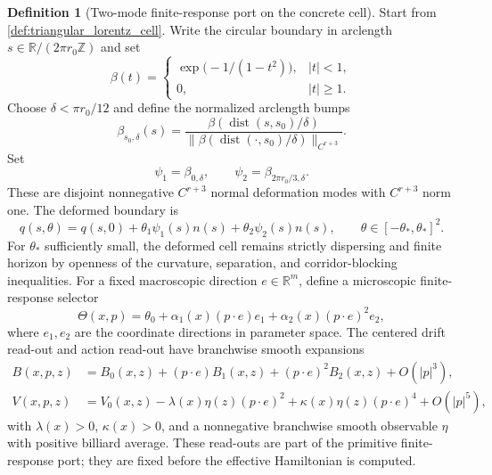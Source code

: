 \documentclass[11pt]{amsart}
\theoremstyle{definition}
\newtheorem{definition}[theorem]{Definition}
\theoremstyle{remark}
\newcommand{\R}{\mathbb R}
\newcommand{\dist}{\operatorname{dist}}
\begin{document}
\begin{definition}[Two-mode finite-response port on the concrete cell]
\label{def:two_mode_port_example}
Start from \cref{def:triangular_lorentz_cell}.  Write the circular boundary in
arclength $s\in\R/(2\pi r_0\mathbb Z)$ and set
\[
  \beta(t)=
  \begin{cases}
  \exp\!\bigl(-1/(1-t^2)\bigr),& |t|<1,\\
  0,& |t|\ge1.
  \end{cases}
\]
Choose $\delta<\pi r_0/12$ and define the normalized arclength bumps
\[
  \beta_{s_0,\delta}(s)
  =
  \frac{\beta(\dist(s,s_0)/\delta)}
  {\|\beta(\dist(\cdot,s_0)/\delta)\|_{C^{r+3}}}.
\]
Set
\[
  \psi_1=\beta_{0,\delta},
  \qquad
  \psi_2=\beta_{2\pi r_0/3,\delta}.
\]
These are disjoint nonnegative $C^{r+3}$ normal deformation modes with
$C^{r+3}$ norm one.  The deformed boundary is
\[
  q(s,\theta)=q(s,0)+\theta_1\psi_1(s)n(s)
  +\theta_2\psi_2(s)n(s),
  \qquad \theta\in[-\theta_*,\theta_*]^2 .
\]
For $\theta_*$ sufficiently small, the deformed cell remains strictly
dispersing and finite horizon by openness of the curvature, separation, and
corridor-blocking inequalities.
For a fixed macroscopic direction $e\in\R^m$, define a microscopic
finite-response selector
\begin{equation}
  \Theta(x,p)=
  \theta_0+\alpha_1(x)(p\cdot e)e_1
  +\alpha_2(x)(p\cdot e)^2 e_2 ,
\end{equation}
where $e_1,e_2$ are the coordinate directions in parameter space.  The centered
drift read-out and action read-out have branchwise smooth expansions
\begin{align}
  B(x,p,z)&=B_0(x,z)+(p\cdot e)B_1(x,z)+(p\cdot e)^2B_2(x,z)+O(|p|^3),\\
  V(x,p,z)&=V_0(x,z)-\lambda(x)\eta(z)(p\cdot e)^2
  +\kappa(x)\eta(z)(p\cdot e)^4+O(|p|^5),
\end{align}
with $\lambda(x)>0$, $\kappa(x)>0$, and a nonnegative branchwise smooth
observable $\eta$ with positive billiard average.  These read-outs are part of
the primitive finite-response port; they are fixed before the effective
Hamiltonian is computed.
\end{definition}
\end{document}
